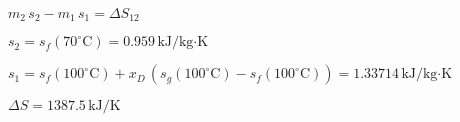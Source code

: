 \( m_2 \, s_2 - m_1 \, s_1 = \Delta S_{12} \)  

\( s_2 = s_f(70^\circ \text{C}) = 0.959 \, \text{kJ/kg·K} \)  

\( s_1 = s_f(100^\circ \text{C}) + x_D \, (s_g(100^\circ \text{C}) - s_f(100^\circ \text{C})) = 1.33714 \, \text{kJ/kg·K} \)  

\( \Delta S = 1387.5 \, \text{kJ/K} \)